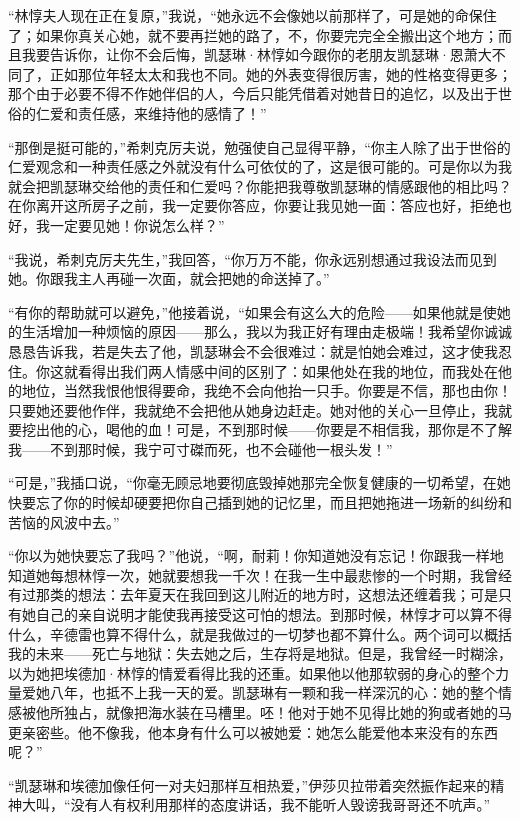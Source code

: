 \par “林惇夫人现在正在复原，”我说，“她永远不会像她以前那样了，可是她的命保住了；如果你真关心她，就不要再拦她的路了，不，你要完完全全搬出这个地方；而且我要告诉你，让你不会后悔，凯瑟琳·林惇如今跟你的老朋友凯瑟琳·恩萧大不同了，正如那位年轻太太和我也不同。她的外表变得很厉害，她的性格变得更多；那个由于必要不得不作她伴侣的人，今后只能凭借着对她昔日的追忆，以及出于世俗的仁爱和责任感，来维持他的感情了！”
\par “那倒是挺可能的，”希刺克厉夫说，勉强使自己显得平静，“你主人除了出于世俗的仁爱观念和一种责任感之外就没有什么可依仗的了，这是很可能的。可是你以为我就会把凯瑟琳交给他的责任和仁爱吗？你能把我尊敬凯瑟琳的情感跟他的相比吗？在你离开这所房子之前，我一定要你答应，你要让我见她一面：答应也好，拒绝也好，我一定要见她！你说怎么样？”
\par “我说，希刺克厉夫先生，”我回答，“你万万不能，你永远别想通过我设法而见到她。你跟我主人再碰一次面，就会把她的命送掉了。”
\par “有你的帮助就可以避免，”他接着说，“如果会有这么大的危险——如果他就是使她的生活增加一种烦恼的原因——那么，我以为我正好有理由走极端！我希望你诚诚恳恳告诉我，若是失去了他，凯瑟琳会不会很难过：就是怕她会难过，这才使我忍住。你这就看得出我们两人情感中间的区别了：如果他处在我的地位，而我处在他的地位，当然我恨他恨得要命，我绝不会向他抬一只手。你要是不信，那也由你！只要她还要他作伴，我就绝不会把他从她身边赶走。她对他的关心一旦停止，我就要挖出他的心，喝他的血！可是，不到那时候——你要是不相信我，那你是不了解我——不到那时候，我宁可寸磔而死，也不会碰他一根头发！”
\par “可是，”我插口说，“你毫无顾忌地要彻底毁掉她那完全恢复健康的一切希望，在她快要忘了你的时候却硬要把你自己插到她的记忆里，而且把她拖进一场新的纠纷和苦恼的风波中去。”
\par “你以为她快要忘了我吗？”他说，“啊，耐莉！你知道她没有忘记！你跟我一样地知道她每想林惇一次，她就要想我一千次！在我一生中最悲惨的一个时期，我曾经有过那类的想法：去年夏天在我回到这儿附近的地方时，这想法还缠着我；可是只有她自己的亲自说明才能使我再接受这可怕的想法。到那时候，林惇才可以算不得什么，辛德雷也算不得什么，就是我做过的一切梦也都不算什么。两个词可以概括我的未来——死亡与地狱：失去她之后，生存将是地狱。但是，我曾经一时糊涂，以为她把埃德加·林惇的情爱看得比我的还重。如果他以他那软弱的身心的整个力量爱她八年，也抵不上我一天的爱。凯瑟琳有一颗和我一样深沉的心：她的整个情感被他所独占，就像把海水装在马槽里。呸！他对于她不见得比她的狗或者她的马更亲密些。他不像我，他本身有什么可以被她爱：她怎么能爱他本来没有的东西呢？”
\par “凯瑟琳和埃德加像任何一对夫妇那样互相热爱，”伊莎贝拉带着突然振作起来的精神大叫，“没有人有权利用那样的态度讲话，我不能听人毁谤我哥哥还不吭声。”
